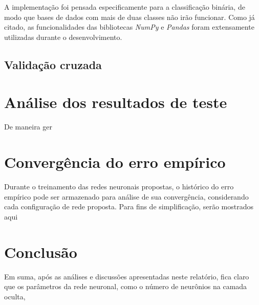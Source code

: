 \documentclass{article}
\begin{document}
A implementação foi pensada especificamente para a classificação binária, de modo que bases de dados com mais de duas classes não irão funcionar. Como já citado, as funcionalidades das bibliotecas \textit{NumPy} e \textit{Pandas} 
foram extensamente utilizadas durante o desenvolvimento.

\subsection{Validação cruzada}


\section{Análise dos resultados de teste}

De maneira ger

\section{Convergência do erro empírico}

Durante o treinamento das redes neuronais propostas, o histórico do erro empírico pode ser armazenado para análise de sua convergência, considerando cada configuração de rede proposta. Para fins de simplificação, serão mostrados
aqui

\section{Conclusão}

Em suma, após as análises e discussões apresentadas neste relatório, fica claro que os parâmetros da rede neuronal, como o número de neurônios na camada oculta,
\end{document}
